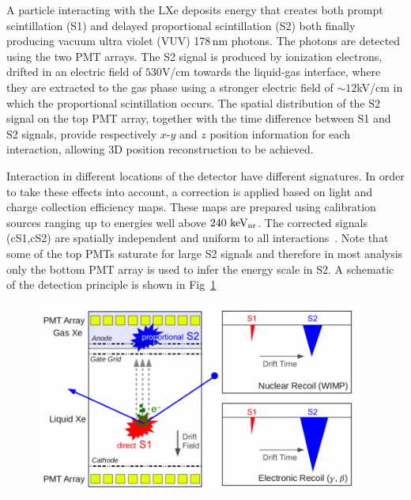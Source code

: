 A particle interacting with the LXe deposits energy that creates both
prompt scintillation (S1) and delayed proportional scintillation (S2) both finally producing vacuum ultra violet (VUV) 178\,nm photons. The photons are detected using the two PMT arrays. The S2 signal is produced by ionization electrons, drifted in an electric field of $530$V/cm towards the liquid-gas interface, where they are extracted to the gas phase using a stronger electric field of $\sim12$kV/cm in which the proportional scintillation occurs. 
The spatial distribution of the S2 signal on the top PMT array, together with the time difference between S1 and S2 signals, provide respectively $x$-$y$ and $z$ position information for each interaction, allowing 3D position reconstruction to be achieved.

Interaction in different locations of  the detector have different signatures. In order to take these effects into account, a correction is applied based on light and charge collection efficiency maps. These maps are prepared using calibration sources ranging up to energies well above $240~\mathrm{keV_\mathrm{nr}}$. The corrected signals (cS1,cS2) are spatially independent and uniform to all interactions~\cite{xe100_instr2012}. Note that some of the top PMTs saturate for large S2 signals and therefore in most analysis only the bottom PMT array is used to infer the energy scale in S2. A schematic of the detection principle is shown in Fig~\ref{fig:xe100TPC}

\begin{figure}[]
	\centering
	\includegraphics[width=0.95\textwidth]{figs/xe100TPC.png}
	\label{fig:xe100TPC}
\end{figure}

